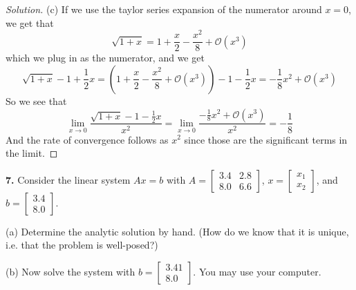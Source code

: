 \documentclass[12pt]{amsart}
\newenvironment{solution}
{\begin{proof}[Solution]}
{\end{proof}}
\begin{document}
\begin{onehalfspace}
\begin{solution}
            (c) If we use the taylor series expansion of the numerator around $x = 0$, we get that
            \begin{displaymath}
                \sqrt{1+x} = 1 + \frac{x}{2} - \frac{x^2}{8} + \mathcal{O}(x^3)
            \end{displaymath}
            which we plug in as the numerator, and we get
            \begin{displaymath}
                \sqrt{1+x} - 1 + \frac{1}{2} x = \left(1 + \frac{x}{2} - \frac{x^2}{8} + \mathcal{O}(x^3)\right) - 1 - \frac{1}{2}x = -\frac{1}{8}x^2 + \mathcal{O}(x^3)
            \end{displaymath}
            So we see that
            \begin{displaymath}
                \lim_{x\rightarrow 0} \frac{\sqrt{1+x} - 1 - \frac{1}{2}x}{x^2} = \lim_{x\rightarrow 0} \frac{-\frac{1}{8}x^2 + \mathcal{O}(x^3)}{x^2} = -\frac{1}{8}
            \end{displaymath}
            And the rate of convergence follows as $x^2$ since those are the significant terms in the limit.
        \end{solution}

        \textbf{7.} Consider the linear system $Ax=b$ with $A=\left[\begin{matrix}3.4 & 2.8 \\ 8.0 & 6.6\end{matrix}\right]$,
        $x = \left[\begin{matrix}x_1 \\ x_2\end{matrix}\right]$, and $b = \left[\begin{matrix}3.4 \\ 8.0\end{matrix}\right]$.

        (a) Determine the analytic solution by hand. (How do we know that it is unique, i.e. that the problem is well-posed?)

        (b) Now solve the system with $b = \left[\begin{matrix}3.41 \\ 8.0\end{matrix}\right]$. You may use your computer.


\end{onehalfspace}
\end{document}
